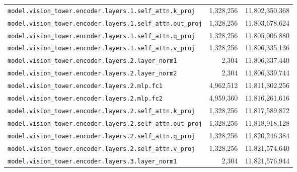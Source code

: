 \documentclass[10pt,a4paper]{article}
\theoremstyle{definition}
\begin{document}
\begin{appendices}
\begin{longtable}{p{9.5cm}rr}
\texttt{model.\allowbreak{}vision\_tower.\allowbreak{}encoder.\allowbreak{}layers.\allowbreak{}1.\allowbreak{}self\_attn.\allowbreak{}k\_proj} & 1,328,256 & 11,802,350,368 \\
\texttt{model.\allowbreak{}vision\_tower.\allowbreak{}encoder.\allowbreak{}layers.\allowbreak{}1.\allowbreak{}self\_attn.\allowbreak{}out\_proj} & 1,328,256 & 11,803,678,624 \\
\texttt{model.\allowbreak{}vision\_tower.\allowbreak{}encoder.\allowbreak{}layers.\allowbreak{}1.\allowbreak{}self\_attn.\allowbreak{}q\_proj} & 1,328,256 & 11,805,006,880 \\
\texttt{model.\allowbreak{}vision\_tower.\allowbreak{}encoder.\allowbreak{}layers.\allowbreak{}1.\allowbreak{}self\_attn.\allowbreak{}v\_proj} & 1,328,256 & 11,806,335,136 \\
\texttt{model.\allowbreak{}vision\_tower.\allowbreak{}encoder.\allowbreak{}layers.\allowbreak{}2.\allowbreak{}layer\_norm1} & 2,304 & 11,806,337,440 \\
\texttt{model.\allowbreak{}vision\_tower.\allowbreak{}encoder.\allowbreak{}layers.\allowbreak{}2.\allowbreak{}layer\_norm2} & 2,304 & 11,806,339,744 \\
\texttt{model.\allowbreak{}vision\_tower.\allowbreak{}encoder.\allowbreak{}layers.\allowbreak{}2.\allowbreak{}mlp.\allowbreak{}fc1} & 4,962,512 & 11,811,302,256 \\
\texttt{model.\allowbreak{}vision\_tower.\allowbreak{}encoder.\allowbreak{}layers.\allowbreak{}2.\allowbreak{}mlp.\allowbreak{}fc2} & 4,959,360 & 11,816,261,616 \\
\texttt{model.\allowbreak{}vision\_tower.\allowbreak{}encoder.\allowbreak{}layers.\allowbreak{}2.\allowbreak{}self\_attn.\allowbreak{}k\_proj} & 1,328,256 & 11,817,589,872 \\
\texttt{model.\allowbreak{}vision\_tower.\allowbreak{}encoder.\allowbreak{}layers.\allowbreak{}2.\allowbreak{}self\_attn.\allowbreak{}out\_proj} & 1,328,256 & 11,818,918,128 \\
\texttt{model.\allowbreak{}vision\_tower.\allowbreak{}encoder.\allowbreak{}layers.\allowbreak{}2.\allowbreak{}self\_attn.\allowbreak{}q\_proj} & 1,328,256 & 11,820,246,384 \\
\texttt{model.\allowbreak{}vision\_tower.\allowbreak{}encoder.\allowbreak{}layers.\allowbreak{}2.\allowbreak{}self\_attn.\allowbreak{}v\_proj} & 1,328,256 & 11,821,574,640 \\
\texttt{model.\allowbreak{}vision\_tower.\allowbreak{}encoder.\allowbreak{}layers.\allowbreak{}3.\allowbreak{}layer\_norm1} & 2,304 & 11,821,576,944 \\

\end{longtable}
\end{appendices}
\end{document}
